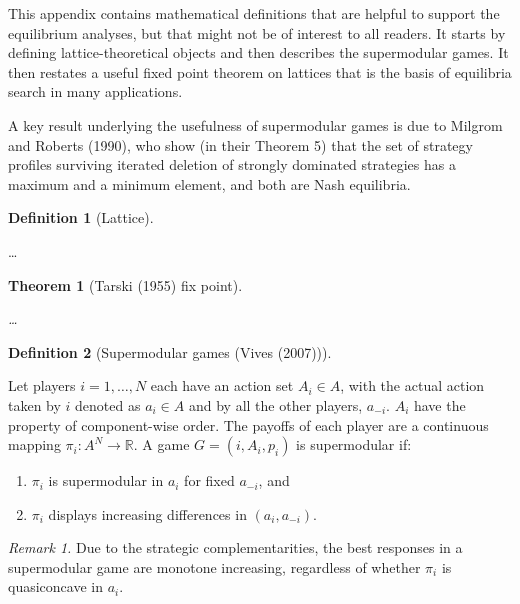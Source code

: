 \documentclass[
]{article}
\theoremstyle{plain}
\newtheorem{theorem}{Theorem}[section]
\theoremstyle{definition}
\newtheorem{definition}{Definition}[section]
\theoremstyle{remark}
\begin{document}
This appendix contains mathematical definitions that are helpful to
support the equilibrium analyses, but that might not be of interest to
all readers. It starts by defining lattice-theoretical objects and then
describes the supermodular games. It then restates a useful fixed point
theorem on lattices that is the basis of equilibria search in many
applications.

A key result underlying the usefulness of supermodular games is due to
Milgrom and Roberts (1990), who show (in their Theorem 5) that the set
of strategy profiles surviving iterated deletion of strongly dominated
strategies has a maximum and a minimum element, and both are Nash
equilibria.

\begin{definition}[Lattice]\protect\hypertarget{def-lattice}{}\label{def-lattice}

\ldots{}

\end{definition}

\begin{theorem}[Tarski (1955) fix
point]\protect\hypertarget{thm-fixedpoint}{}\label{thm-fixedpoint}

\ldots{}

\end{theorem}

\begin{definition}[Supermodular games (Vives
(2007))]\protect\hypertarget{def-supermodular}{}\label{def-supermodular}

Let players \(i= 1, \dots, N\) each have an action set \(A_i \in A\),
with the actual action taken by \(i\) denoted as \(a_i \in A\) and by
all the other players, \(a_{-i}\). \(A_i\) have the property of
component-wise order. The payoffs of each player are a continuous
mapping \(\pi_i : A^N \to \mathbb{R}\). A game \(G = (i, A_i, p_i)\) is
supermodular if:

\begin{enumerate}
\def\labelenumi{\arabic{enumi}.}
\item
  \(\pi_i\) is supermodular in \(a_i\) for fixed \(a_{-i}\), and
\item
  \(\pi_i\) displays increasing differences in \((a_i, a_{-i})\).
\end{enumerate}

\emph{Remark 1.} Due to the strategic complementarities, the best
responses in a supermodular game are monotone increasing, regardless of
whether \(\pi_i\) is quasiconcave in \(a_i\).

\end{definition}
\end{document}
